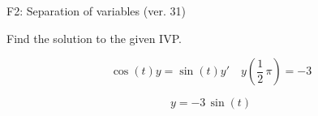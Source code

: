 \begin{exercise}
  \begin{exerciseTitle}F2: Separation of variables (ver. 31)\end{exerciseTitle}
  \begin{exerciseStatement}
    
Find the solution to the given IVP.

    
\[\cos\left(t\right) y= \sin\left(t\right) y'\hspace{1em} y\left( \frac{1}{2} \, \pi \right)= -3\]

  \end{exerciseStatement}
  \begin{exerciseAnswer}
    
\[y= -3 \, \sin\left(t\right)\]

  \end{exerciseAnswer}
\end{exercise}
